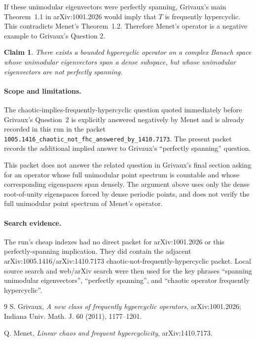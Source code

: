 \documentclass[11pt]{article}
\newtheorem*{claim}{Claim}
\begin{document}
If these unimodular eigenvectors were perfectly spanning, Grivaux's main
Theorem~1.1 in arXiv:1001.2026 would imply that $T$ is frequently
hypercyclic.  This contradicts Menet's Theorem~1.2.  Therefore Menet's
operator is a negative example to Grivaux's Question 2.

\begin{claim}
There exists a bounded hypercyclic operator on a complex Banach space whose
unimodular eigenvectors span a dense subspace, but whose unimodular
eigenvectors are not perfectly spanning.
\end{claim}

\paragraph{Scope and limitations.}
The chaotic-implies-frequently-hypercyclic question quoted immediately before
Grivaux's Question~2 is explicitly answered negatively by Menet and is already
recorded in this run in the packet
\texttt{1005.1416\_chaotic\_not\_fhc\_answered\_by\_1410.7173}.  The present
packet records the additional implied answer to Grivaux's ``perfectly
spanning'' question.

This packet does not answer the related question in Grivaux's final section
asking for an operator whose full unimodular point spectrum is countable and
whose corresponding eigenspaces span densely.  The argument above uses only
the dense root-of-unity eigenspaces forced by dense periodic points, and does
not verify the full unimodular point spectrum of Menet's operator.

\paragraph{Search evidence.}
The run's cheap indexes had no direct packet for arXiv:1001.2026 or this
perfectly-spanning implication.  They did contain the adjacent
arXiv:1005.1416/arXiv:1410.7173 chaotic-not-frequently-hypercyclic packet.
Local source search and web/arXiv search were then used for the key phrases
``spanning unimodular eigenvectors'', ``perfectly spanning'', and
``chaotic operator frequently hypercyclic''.

\begin{thebibliography}{9}
S. Grivaux,
\emph{A new class of frequently hypercyclic operators},
arXiv:1001.2026; Indiana Univ. Math. J. 60 (2011), 1177--1201.

Q. Menet,
\emph{Linear chaos and frequent hypercyclicity},
arXiv:1410.7173.
\end{thebibliography}
\end{document}
